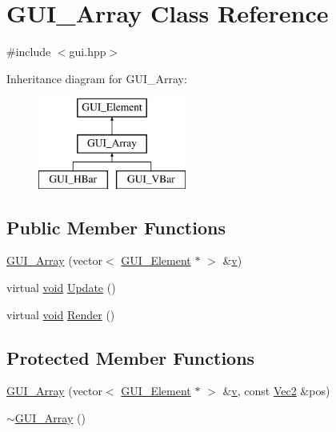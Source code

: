 \hypertarget{class_g_u_i___array}{\section{G\-U\-I\-\_\-\-Array Class Reference}
\label{class_g_u_i___array}
}


{\ttfamily \#include $<$gui.\-hpp$>$}

Inheritance diagram for G\-U\-I\-\_\-\-Array\-:\begin{figure}[H]
\begin{center}
\leavevmode
\includegraphics[height=3.000000cm]{class_g_u_i___array}
\end{center}
\end{figure}
\subsection*{Public Member Functions}
\begin{DoxyCompactItemize}
\item 
\hyperlink{class_g_u_i___array_a53eb1af393692d1d7da08d2c74bc69b0}{G\-U\-I\-\_\-\-Array} (vector$<$ \hyperlink{class_g_u_i___element}{G\-U\-I\-\_\-\-Element} $\ast$ $>$ \&\hyperlink{_s_d_l__opengl_8h_a10a82eabcb59d2fcd74acee063775f90}{v})
\item 
virtual \hyperlink{_s_d_l__opengles2__gl2ext_8h_ae5d8fa23ad07c48bb609509eae494c95}{void} \hyperlink{class_g_u_i___array_a1cfd57bb71970a0e793139df7da101ee}{Update} ()
\item 
virtual \hyperlink{_s_d_l__opengles2__gl2ext_8h_ae5d8fa23ad07c48bb609509eae494c95}{void} \hyperlink{class_g_u_i___array_a3b39cb4889990e9316d996d1dff7a725}{Render} ()
\end{DoxyCompactItemize}
\subsection*{Protected Member Functions}
\begin{DoxyCompactItemize}
\item 
\hyperlink{class_g_u_i___array_a0e8a4333a364d08662bdde15fd27b336}{G\-U\-I\-\_\-\-Array} (vector$<$ \hyperlink{class_g_u_i___element}{G\-U\-I\-\_\-\-Element} $\ast$ $>$ \&\hyperlink{_s_d_l__opengl_8h_a10a82eabcb59d2fcd74acee063775f90}{v}, const \hyperlink{class_vec2}{Vec2} \&pos)
\item 
\hyperlink{class_g_u_i___array_ab4fb008f7955c59fb6ee2319dd24be5c}{$\sim$\-G\-U\-I\-\_\-\-Array} ()
\end{DoxyCompactItemize}
